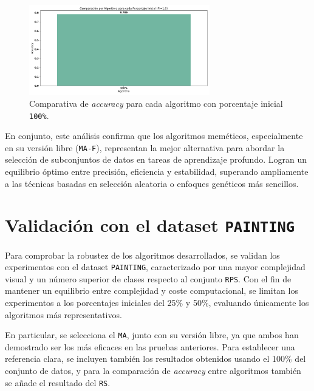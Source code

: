 \begin{figure}[htp]
    \centering
    \includegraphics[width=0.7\textwidth]{imagenes/evaluaciones/final/barplot-por-pi/pi-100.png}
    \caption{Comparativa de \textit{accuracy} para cada algoritmo con porcentaje inicial \texttt{100\%}.}
    \label{fig:barplot-por-pi-100}
\end{figure}

En conjunto, este análisis confirma que los algoritmos meméticos, especialmente en su versión libre (\texttt{MA-F}),
representan la mejor alternativa para abordar la selección de subconjuntos de datos en tareas de aprendizaje profundo.
Logran un equilibrio óptimo entre precisión, eficiencia y estabilidad, superando ampliamente a las técnicas basadas en selección aleatoria o enfoques genéticos más sencillos.


\section{Validación con el dataset \texttt{PAINTING}}\label{sec:validacion-con-painting}
Para comprobar la robustez de los algoritmos desarrollados, se validan los experimentos con el dataset \texttt{PAINTING},
caracterizado por una mayor complejidad visual y un número superior de clases respecto al conjunto \texttt{RPS}.
Con el fin de mantener un equilibrio entre complejidad y coste computacional, se limitan los experimentos a los porcentajes iniciales del 25\% y 50\%,
evaluando únicamente los algoritmos más representativos.

En particular, se selecciona el \texttt{MA}, junto con su versión libre, ya que ambos han demostrado ser los más eficaces en las pruebas anteriores.
Para establecer una referencia clara, se incluyen también los resultados obtenidos usando el 100\% del conjunto de datos, y para la comparación de
\textit{accuracy} entre algoritmos también se añade el resultado del \texttt{RS}.

